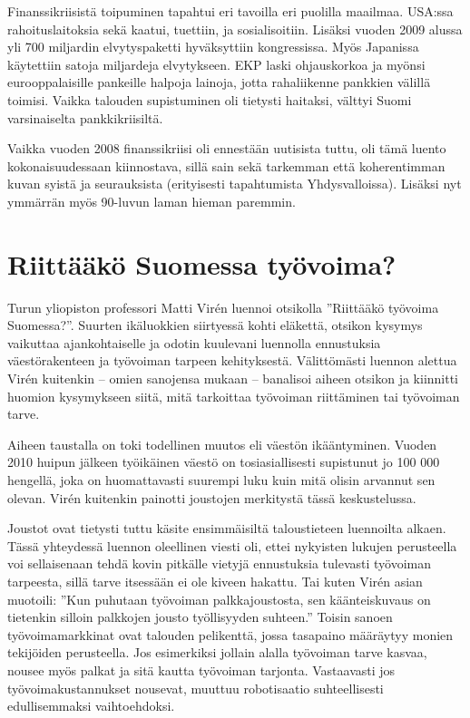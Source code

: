 \documentclass[12pt]{article}
\begin{document}
Finanssikriisistä toipuminen tapahtui eri tavoilla eri puolilla maailmaa.
USA:ssa rahoituslaitoksia sekä kaatui, tuettiin, ja sosialisoitiin. Lisäksi
vuoden 2009 alussa yli 700 miljardin elvytyspaketti hyväksyttiin kongressissa.
Myös Japanissa käytettiin satoja miljardeja elvytykseen. EKP laski ohjauskorkoa
ja myönsi eurooppalaisille pankeille halpoja lainoja, jotta rahaliikenne
pankkien välillä toimisi. Vaikka talouden supistuminen oli tietysti haitaksi,
välttyi Suomi varsinaiselta pankkikriisiltä.

Vaikka vuoden 2008 finanssikriisi oli ennestään uutisista tuttu, oli tämä
luento kokonaisuudessaan kiinnostava, sillä sain sekä tarkemman että
koherentimman kuvan syistä ja seurauksista (erityisesti tapahtumista
Yhdysvalloissa). Lisäksi nyt ymmärrän myös 90-luvun laman hieman paremmin.


\newpage
\section{Riittääkö Suomessa työvoima?}

Turun yliopiston professori Matti Virén luennoi otsikolla ''Riittääkö työvoima
Suomessa?''. Suurten ikäluokkien siirtyessä kohti eläkettä, otsikon kysymys
vaikuttaa ajankohtaiselle ja odotin kuulevani luennolla ennustuksia
väes\-tö\-ra\-ken\-teen ja työvoiman tarpeen kehityksestä. Välittömästi luennon
alettua Virén kuitenkin -- omien sanojensa mukaan -- banalisoi aiheen otsikon
ja kiinnitti huomion kysymykseen siitä, mitä tarkoittaa työvoiman riittäminen
tai työvoiman tarve.

Aiheen taustalla on toki todellinen muutos eli väestön ikääntyminen. Vuoden
2010 huipun jälkeen työikäinen väestö on tosiasiallisesti supistunut jo 100 000
hengellä, joka on huomattavasti suurempi luku kuin mitä olisin arvannut sen
olevan. Virén kuitenkin painotti joustojen merkitystä tässä keskustelussa.

Joustot ovat tietysti tuttu käsite ensimmäisiltä taloustieteen luennoilta
alkaen. Tässä yhteydessä luennon oleellinen viesti oli, ettei nykyisten lukujen
perusteella voi sellaisenaan tehdä kovin pitkälle vietyjä ennustuksia tulevasti
työvoiman tarpeesta, sillä tarve itsessään ei ole kiveen hakattu. Tai kuten
Virén asian muotoili: ''Kun puhutaan työvoiman palkkajoustosta, sen
käänteiskuvaus on tietenkin silloin palkkojen jousto työllisyyden suhteen.''
Toisin sanoen työvoimamarkkinat ovat talouden pelikenttä, jossa tasapaino
määräytyy monien tekijöiden perusteella. Jos esimerkiksi jollain alalla
työvoiman tarve kasvaa, nousee myös palkat ja sitä kautta työvoiman tarjonta.
Vastaavasti jos työvoimakustannukset nousevat, muuttuu robotisaatio
suhteellisesti edullisemmaksi vaihtoehdoksi.
\end{document}
